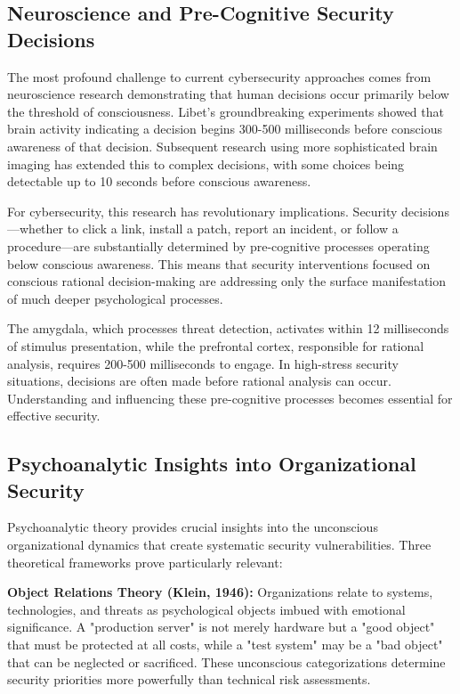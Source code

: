 \documentclass[10pt, twocolumn]{article}
\begin{document}
\subsection{Neuroscience and Pre-Cognitive Security Decisions}

The most profound challenge to current cybersecurity approaches comes from neuroscience research demonstrating that human decisions occur primarily below the threshold of consciousness. Libet's groundbreaking experiments showed that brain activity indicating a decision begins 300-500 milliseconds before conscious awareness of that decision\cite{libet1983}. Subsequent research using more sophisticated brain imaging has extended this to complex decisions, with some choices being detectable up to 10 seconds before conscious awareness\cite{soon2008}.

For cybersecurity, this research has revolutionary implications. Security decisions—whether to click a link, install a patch, report an incident, or follow a procedure—are substantially determined by pre-cognitive processes operating below conscious awareness. This means that security interventions focused on conscious rational decision-making are addressing only the surface manifestation of much deeper psychological processes.

The amygdala, which processes threat detection, activates within 12 milliseconds of stimulus presentation, while the prefrontal cortex, responsible for rational analysis, requires 200-500 milliseconds to engage\cite{ledoux2000}. In high-stress security situations, decisions are often made before rational analysis can occur. Understanding and influencing these pre-cognitive processes becomes essential for effective security.

\subsection{Psychoanalytic Insights into Organizational Security}

Psychoanalytic theory provides crucial insights into the unconscious organizational dynamics that create systematic security vulnerabilities. Three theoretical frameworks prove particularly relevant:

\textbf{Object Relations Theory (Klein, 1946):} Organizations relate to systems, technologies, and threats as psychological objects imbued with emotional significance. A "production server" is not merely hardware but a "good object" that must be protected at all costs, while a "test system" may be a "bad object" that can be neglected or sacrificed. These unconscious categorizations determine security priorities more powerfully than technical risk assessments.
\end{document}
